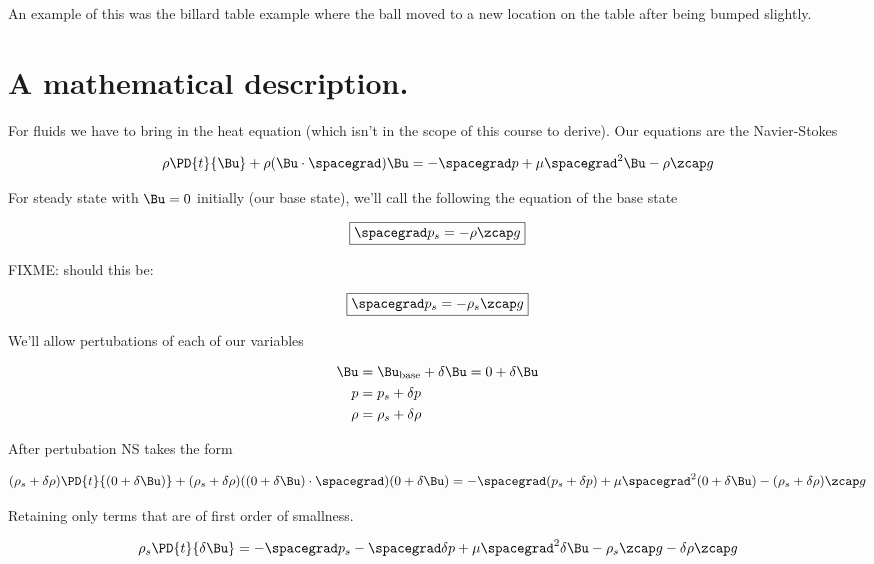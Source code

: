 An example of this was the billard table example where the ball moved to a new location on the table after being bumped slightly.

\section{A mathematical description.}

For fluids we have to bring in the heat equation (which isn't in the scope of this course to derive).  Our equations are the Navier-Stokes

\begin{equation}\label{eqn:continuumL21:50}
\rho \PD{t}{\Bu} + \rho (\Bu \cdot \spacegrad) \Bu = - \spacegrad p + \mu \spacegrad^2 \Bu - \rho \zcap g
\end{equation}

For steady state with $\Bu = 0$ initially (our base state), we'll call the following the equation of the base state

\begin{equation}\label{eqn:continuumL21:70}
\boxed{
\spacegrad p_s = -\rho \zcap g
}
\end{equation}

FIXME: should this be:

\begin{equation}\label{eqn:continuumL21:70bb}
\boxed{
\spacegrad p_s = -\rho_s \zcap g
}
\end{equation}

We'll allow pertubations of each of our variables

\begin{align*}
\Bu &= \Bu_\text{base} + \delta \Bu = 0 + \delta \Bu \\
p &= p_s + \delta p \\
\rho &= \rho_s + \delta \rho
\end{align*}

After pertubation NS takes the form

\begin{equation}\label{eqn:continuumL21:90}
(\rho_s + \delta \rho )\PD{t}{(0 + \delta \Bu)} + (\rho_s + \delta \rho) ((0 + \delta \Bu) \cdot \spacegrad) (0 + \delta \Bu) = - \spacegrad (p_s + \delta p) + \mu \spacegrad^2 (0 + \delta \Bu) - (\rho_s + \delta \rho) \zcap g
\end{equation}

Retaining only terms that are of first order of smallness.

\begin{equation}\label{eqn:continuumL21:110}
\rho_s \PD{t}{\delta \Bu} = - \spacegrad p_s - \spacegrad \delta p + \mu \spacegrad^2 \delta \Bu - \rho_s \zcap g - \delta \rho \zcap g
\end{equation}

